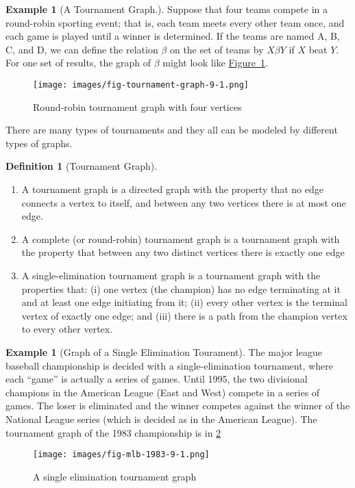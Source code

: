 \documentclass[10pt,]{book}
\theoremstyle{plain}
\theoremstyle{definition}
\newtheorem{definition}[theorem]{Definition}
\theoremstyle{definition}
\theoremstyle{definition}
\newtheorem{example}[theorem]{Example}
\theoremstyle{definition}
\theoremstyle{definition}
\numberwithin{equation}{section}
\begin{document}
\begin{example}[A Tournament Graph.]\label{ex-tournament-graph-9-1}
Suppose that four teams compete in a round-robin sporting event; that is, each team meets every other team
once, and each game is played until a winner is determined. If the teams are named A, B, C, and D, we can define the relation \(\beta\) on the set
of teams by \(X \beta  Y\) if \(X\) beat \(Y\). For one set of results, the graph of \(\beta\) might look like \hyperref[fig-tournament-graph-9-1]{Figure~\ref{fig-tournament-graph-9-1}}.%
\leavevmode%
\begin{figure}
\centering
\texttt{[image: images/fig-tournament-graph-9-1.png]}
\caption{Round-robin tournament graph with four vertices
                \label{fig-tournament-graph-9-1}}
\end{figure}
\end{example}
\par
There are many types of tournaments and they all can be modeled by different types of graphs.%
\begin{definition}[Tournament Graph]\label{def-tournament-graph}
\leavevmode%
\begin{enumerate}[label=\alph*]
\item\hypertarget{li-1}{} A tournament graph is a directed graph with the property that no edge connects a vertex to itself, and between any two vertices there is at most one edge.%
\item\hypertarget{li-2}{}A complete (or round-robin) tournament graph is a tournament graph with the property that between any two distinct vertices there is exactly
one edge%
\item\hypertarget{li-3}{}A single-elimination tournament graph is a tournament graph with the properties that: (i) one vertex (the champion) has no edge terminating
at it and at least one edge initiating from it; (ii) every other vertex is the terminal vertex of exactly one edge; and (iii) there is a path from
the champion vertex to every other vertex.%
\end{enumerate}
%
\end{definition}
\begin{example}[Graph of a Single Elimination Tourament]\label{ex-single-elimination-9-1}
 The major league baseball championship is decided with a single-elimination tournament, where each ``game'' is actually
a series of games. Until 1995, the two divisional champions in the American League (East and West) compete in a series of games. The loser is eliminated and the winner competes against the winner of the National League series (which is decided as in the American League). The tournament graph of the
1983 championship is in \hyperref[fig-mlb-1983-9-1]{\ref{fig-mlb-1983-9-1}}%
\leavevmode%
\begin{figure}
\centering
\texttt{[image: images/fig-mlb-1983-9-1.png]}
\caption{A single elimination tournament graph
		 \label{fig-mlb-1983-9-1}}
\end{figure}
\end{example}
\end{document}
